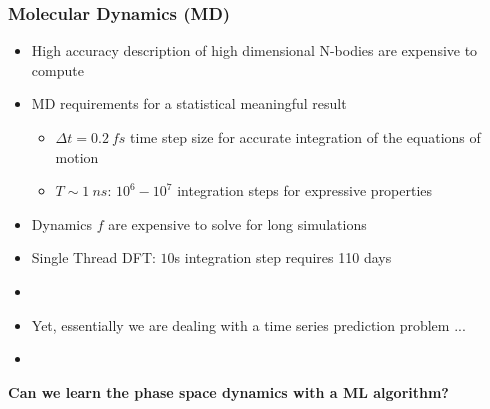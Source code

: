 \documentclass[usenames, dvipsnames, t]{beamer}
\begin{document}
\begin{frame}
	\frametitle{Molecular Dynamics (MD)}
	\begin{itemize}
		\item<+-> High accuracy description of high dimensional N-bodies are expensive to compute
		\item<+-> MD requirements for a statistical meaningful result
		\begin{itemize}
			\item $\Delta t = 0.2 \ fs$ time step size for accurate integration of the equations of motion
			\item $T \sim 1 \ ns$: $10^6 - 10^7$ integration steps for expressive properties
		\end{itemize}
		\item<+-> Dynamics $f$ are expensive to solve for long simulations
		\item<+-> Single Thread DFT: $10$s integration step requires 110 days
		\item[] 
		\item<+-> Yet, essentially we are dealing with a time series prediction problem ...
		\item[] 
	\end{itemize}
	\onslide<+->
		\begin{center}
		\textbf{Can we learn the phase space dynamics with a ML algorithm?}
		\end{center}
\end{frame}
\end{document}
